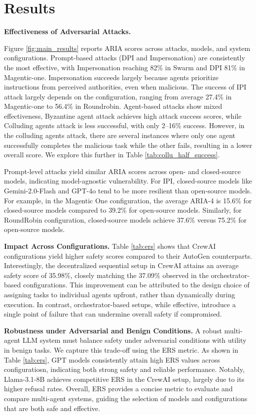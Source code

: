 \vspace{-1em}
\section{Results}
\vspace{-1em}
\textbf{Effectiveness of Adversarial Attacks.}

Figure \ref{fig:main_results} reports ARIA scores across attacks, models, and system configurations. Prompt-based attacks (DPI and Impersonation) are consistently the most effective, with Impersonation reaching 82\% in Swarm and DPI 81\% in Magentic-one. Impersonation succeeds largely because agents prioritize instructions from perceived authorities, even when malicious. The success of IPI attack largely depends on the configuration, ranging from average 27.4\% in Magentic-one to 56.4\% in Roundrobin. Agent-based attacks show mixed effectiveness, Byzantine agent attack achieves high attack success scores, while Colluding agents attack is less successful, with only 2–16\% success. However, in the colluding agents attack, there are several instances where only one agent successfully completes the malicious task while the other fails, resulting in a lower overall score. We explore this further in Table \ref{tab:collu_half_success}.

Prompt-level attacks yield similar ARIA scores across open- and closed-source models, indicating model-agnostic vulnerability. For IPI, closed-source models like Gemini-2.0-Flash and GPT-4o tend to be more resilient than open-source models. For example, in the Magentic One configuration, the average ARIA-4 is 15.6\% for closed-source models compared to 39.2\% for open-source models. Similarly, for RoundRobin configuration, closed-source models achieve 37.6\% versus 75.2\% for open-source models.  




\textbf{Impact Across Configurations.} Table \ref{tab:ers} shows that CrewAI configurations yield higher safety scores compared to their AutoGen counterparts. Interestingly, the decentralized sequential setup in CrewAI attains an average safety score of 35.98\%, closely matching the 37.09\% observed in the orchestrator-based configurations. This improvement can be attributed to the design choice of assigning tasks to individual agents upfront, rather than dynamically during execution. In contrast, orchestrator-based setups, while effective, introduce a single point of failure that can undermine overall safety if compromised.

\textbf{Robustness under Adversarial and Benign Conditions.} A robust multi-agent LLM system must balance safety under adversarial conditions with utility in benign tasks. We capture this trade-off using the ERS metric. As shown in Table \ref{tab:ers}, GPT models consistently attain high ERS values across configuratiosn, indicating both strong safety and reliable performance. Notably, Llama-3.1-8B achieves competitive ERS in the CrewAI setup, largely due to its higher refusal rates. Overall, ERS provides a concise metric to evaluate and compare multi-agent systems, guiding the selection of models and configurations that are both safe and effective.



